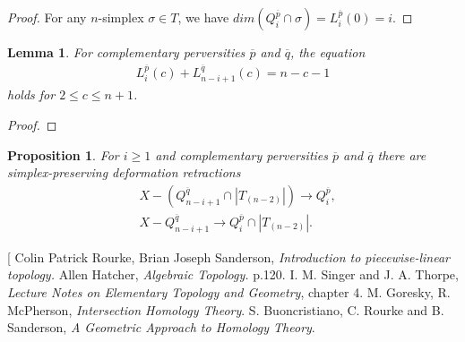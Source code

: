 \documentclass[11pt]{book}
\newtheorem{prop}{Proposition}
\newtheorem{lemma}{Lemma}
\begin{document}
\begin{proof}
For any $n$-simplex $\sigma \in T$, we have $dim(Q_i^{\overline{p}} \cap \sigma)=L_i^{\overline{p}}(0)=i$.
\end{proof}

\begin{lemma}
For complementary perversities $\overline{p}$ and $\overline{q}$, the equation
\begin{align*}
L_i^{\overline{p}}(c) + L_{n-i+1}^{\overline{q}}(c)=n-c-1
\end{align*}
holds for $2 \leq c \leq n+1$.
\end{lemma}

\begin{proof}

\end{proof}

\begin{prop}
For $i \geq 1$ and complementary perversities $\overline{p}$ and $\overline{q}$ there are simplex-preserving deformation retractions
\begin{align*}
&X-(Q_{n-i+1}^{\overline{q}} \cap |T_{(n-2)}|) \to Q_i^{\overline{p}} , \\
&X- Q_{n-i+1}^{\overline{q}} \to Q_i^{\overline{p}} \cap |T_{(n-2)}|.
\end{align*}
\end{prop}


\begin{thebibliography}[
Colin Patrick Rourke, Brian Joseph Sanderson, \textit{Introduction to piecewise-linear topology.}
Allen Hatcher, \textit{Algebraic Topology.} p.120.
I. M. Singer and J. A. Thorpe, \textit{Lecture Notes on Elementary Topology and Geometry}, chapter 4.
M. Goresky, R. McPherson, \textit{Intersection Homology Theory}.
S. Buoncristiano, C. Rourke and B. Sanderson, \textit{A Geometric Approach to Homology Theory}.
\end{thebibliography}
\end{document}
